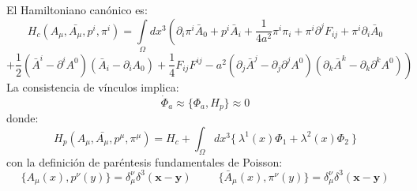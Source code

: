 \documentclass[a4paper,12pt]{article}
\begin{document}
El Hamiltoniano canónico es:
\begin{equation}
H_c(A_\mu,\bar{A_\mu},p^i,\pi^i) =\int\limits_{\Omega}dx^{3}\left(\partial_i \pi^i\bar{A}_0+p^{i}\bar{A}_i +\frac{1}{4a^2}\pi^{i}\pi_i+\pi^{i}\partial^j F_{ij}+\pi^{i}\partial_i\bar{ A}_0 \right. 
\label{hacono}
\end{equation}
$$\left.+\frac{1}{2}(\bar{A}^i-\partial^i A^0)(\bar{A}_i-\partial_i A_0)+\frac{1}{4} F_{ij}F^{ij}-a^2(\partial_j\bar{A}^j-\partial_j\partial^jA^0)(\partial_k\bar{A}^k-\partial_k\partial^kA^0)\right)
$$
La consistencia de vínculos implica:
\begin{equation}
\dot{\Phi}_a\approx\{\Phi_a,H_p\} \approx 0
\end{equation}
donde:
$$H_p(A_\mu,\bar{A_\mu},p^\mu,\pi^\mu) =H_c+\int_{\Omega}dx^3\{\ \lambda^1(x)\Phi_1+\lambda^2(x)\Phi_2\ \}$$ 
con la definición de paréntesis fundamentales de Poisson:
\begin{equation}
\{A_\mu(x),p^{\nu}(y)\}=\delta_{\mu}^{\nu}\delta^3(\textbf{x}-\textbf{y})\ \ \ \ \ \ \ \ \ \ \ \{\bar A_\mu(x),\pi^{\nu}(y)\}=\delta_{\mu}^{\nu}\delta^3(\textbf{x}-\textbf{y})       
\end{equation}
\end{document}
